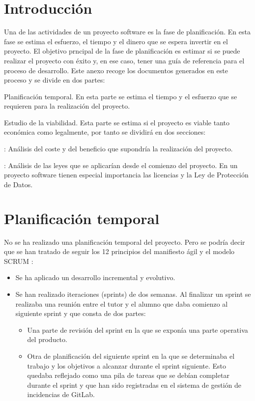 
\section{Introducción}
Una de las actividades de un proyecto software es la fase de planificación. En esta fase se estima el esfuerzo, el tiempo y el dinero que se espera invertir en el proyecto. El objetivo prncipal de la fase de planificación es estimar si se puede realizar el proyecto con éxito y, en ese caso, tener una guía de referencia para el proceso de desarrollo. Este anexo recoge los documentos generados en este proceso y se divide en dos partes:
\begin{description}
	\tightlist
	\item Planificación temporal. En esta parte se estima el tiempo y el esfuerzo que se requieren para la realización del proyecto.
	\item Estudio de la viabilidad. Esta parte se estima si el proyecto es viable tanto económica como legalmente, por tanto se dividirá en dos secciones:
	\begin{description}
		\tightlist
		\item[Viabilidad económica]: Análisis del coste y del beneficio que supondría la realización del proyecto.
		\item[Viabilidad legal]: Análisis de las leyes que se aplicarían desde el comienzo del proyecto. En un proyecto software tienen especial importancia las licencias y la Ley de Protección de Datos.
	\end{description}
\end{description}

\section{Planificación temporal}
No se ha realizado una planificación temporal del proyecto. Pero se podría decir que se han tratado de seguir los 12 principios del manifiesto ágil y el modelo SCRUM \cite{noauthor_scrum_2019}:
\begin{itemize}
	\tightlist
	\item Se ha aplicado un desarrollo incremental y evolutivo.
	\item Se han realizado iteraciones (sprints) de dos semanas. Al finalizar un sprint se realizaba una reunión entre el tutor y el alumno que daba comienzo al siguiente sprint y que consta de dos partes:
	\begin{itemize}
		\item Una parte de revisión del sprint en la que se exponía una parte operativa del producto.
		\item Otra de planificación del siguiente sprint en la que se determinaba el trabajo y los objetivos a alcanzar durante el sprint siguiente. Esto quedaba reflejado como una pila de tareas que se debían completar durante el sprint y que han sido registradas en el sistema de gestión de incidencias de GitLab.
	\end{itemize}
\end{itemize}
